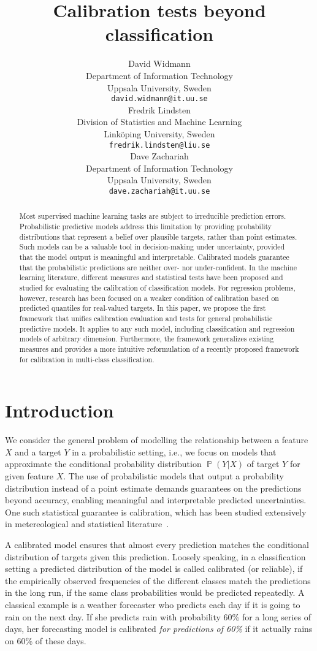 \documentclass{article}
\title{Calibration tests beyond classification}
\author{%
  David Widmann\\
  Department of Information Technology\\
  Uppsala University, Sweden\\
  \texttt{david.widmann@it.uu.se} \\
  \And
  Fredrik Lindsten\\
  Division of Statistics and Machine Learning\\
  Linköping University, Sweden\\
  \texttt{fredrik.lindsten@liu.se} \\
  \And
  Dave Zachariah\\
  Department of Information Technology\\
  Uppsala University, Sweden\\
  \texttt{dave.zachariah@it.uu.se}\\
}
\DeclareMathOperator{\Prob}{\mathbb{P}}
\begin{document}
\maketitle

\begin{abstract}
Most supervised machine learning tasks are subject to irreducible prediction
errors. Probabilistic predictive models address this limitation by providing
probability distributions that represent a belief over plausible targets,
rather than point estimates. Such models can be a valuable tool in
decision-making under uncertainty, provided that the model output is
meaningful and interpretable. Calibrated models guarantee that the probabilistic
predictions are neither over- nor under-confident. In the machine learning literature,
different measures and statistical tests have been proposed and studied
for evaluating the calibration of classification models. For
regression problems, however, research has been focused on a weaker
condition of calibration based on predicted quantiles for real-valued targets.
In this paper, we propose the first framework that unifies calibration evaluation and
tests for general probabilistic predictive models. It applies to any such model, including
classification and regression models of arbitrary dimension. Furthermore,
the framework generalizes existing measures and provides a more intuitive
reformulation of a recently proposed framework for calibration in
multi-class classification.
\end{abstract}

\section{Introduction}

We consider the general problem of modelling the relationship
between a feature $X$ and a target $Y$ in a probabilistic setting, i.e., we
focus on models that approximate the conditional probability
distribution $\Prob(Y | X)$ of target $Y$ for given feature $X$. The use of
probabilistic models that output a probability distribution instead
of a point estimate demands guarantees on the predictions beyond accuracy,
enabling meaningful and interpretable predicted uncertainties. One such statistical
guarantee is calibration, which has been studied extensively in metereological
and statistical literature~\citep{DeGroot1983,Murphy1977}.

A calibrated model ensures that almost every prediction matches the
conditional distribution of targets given this prediction.
Loosely speaking, in a classification setting a predicted
distribution of the model is called calibrated (or reliable), if
the empirically observed frequencies of the different classes
match the predictions in the long run, if the same
class probabilities would be predicted repeatedly.
A classical example is a weather forecaster who predicts each day if it is going to
rain on the next day. If she predicts rain with probability 60\% for
a long series of days, her forecasting model is calibrated \emph{for predictions
of 60\%} if it actually rains on 60\% of these days.
\end{document}
